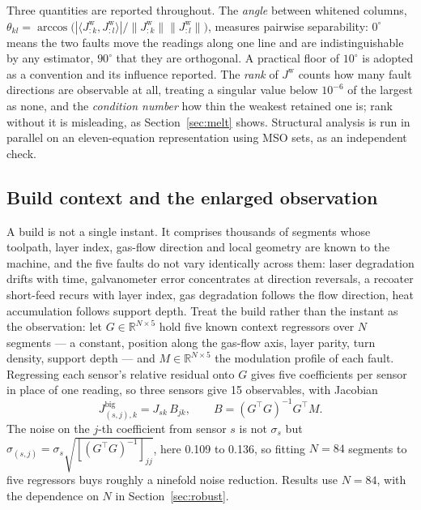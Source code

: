 \documentclass[final,5p,times,twocolumn]{elsarticle}
\begin{document}
Three quantities are reported throughout. The \emph{angle} between whitened
columns, $\theta_{kl} = \arccos\big(|\langle J^{\mathrm{w}}_{:k},
J^{\mathrm{w}}_{:l}\rangle| / \|J^{\mathrm{w}}_{:k}\|
\|J^{\mathrm{w}}_{:l}\|\big)$, measures pairwise separability: $0^\circ$ means
the two faults move the readings along one line and are indistinguishable by any
estimator, $90^\circ$ that they are orthogonal. A practical floor of $10^\circ$
is adopted as a convention and its influence reported. The \emph{rank} of
$J^{\mathrm{w}}$ counts how many fault directions are observable at all, treating
a singular value below $10^{-6}$ of the largest as none, and the \emph{condition
number} how thin the weakest retained one is; rank without it is misleading, as
Section~\ref{sec:melt} shows. Structural analysis is run in parallel on an
eleven-equation representation using MSO sets, as an independent check.

\subsection{Build context and the enlarged observation}
\label{sec:context}

A build is not a single instant. It comprises thousands of segments whose
toolpath, layer index, gas-flow direction and local geometry are known to the
machine, and the five faults do not vary identically across them: laser
degradation drifts with time, galvanometer error concentrates at direction
reversals, a recoater short-feed recurs with layer index, gas degradation follows
the flow direction, heat accumulation follows support depth. Treat the build
rather than the instant as the observation: let $G\in\mathbb{R}^{N\times 5}$ hold
five known context regressors over $N$ segments --- a constant, position along
the gas-flow axis, layer parity, turn density, support depth --- and
$M\in\mathbb{R}^{N\times 5}$ the modulation profile of each fault. Regressing
each sensor's relative residual onto $G$ gives five coefficients per sensor in
place of one reading, so three sensors give 15 observables, with Jacobian
%
\begin{equation}
J^{\mathrm{big}}_{(s,j),k} = J_{sk}\,B_{jk},
\qquad B = (G^{\!\top}G)^{-1}G^{\!\top}M .
\label{eq:big}
\end{equation}
%
The noise on the $j$-th coefficient from sensor $s$ is not $\sigma_s$ but
$\sigma_{(s,j)} = \sigma_s\sqrt{[(G^{\!\top}G)^{-1}]_{jj}}$, here 0.109 to 0.136, so fitting $N=84$ segments to five regressors buys roughly
a ninefold noise reduction. Results use $N=84$, with the dependence on $N$ in
Section~\ref{sec:robust}.
\end{document}
